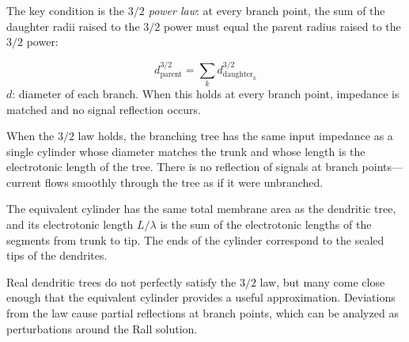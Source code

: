 The key condition is the \emph{$3/2$ power law}: at every branch point, the sum of the daughter radii raised to the $3/2$ power must equal the parent radius raised to the $3/2$ power:

\begin{keyequation}
\begin{equation}
  d_{\text{parent}}^{3/2} = \sum_k d_{\text{daughter}_k}^{3/2}
  \label{eq:rall-32}
\end{equation}
\tcblower
$d$: diameter of each branch. When this holds at every branch point, impedance is matched and no signal reflection occurs.
\end{keyequation}

\noindent When the $3/2$ law holds, the branching tree has the same input impedance as a single cylinder whose diameter matches the trunk and whose length is the electrotonic length of the tree. There is no reflection of signals at branch points---current flows smoothly through the tree as if it were unbranched.

The equivalent cylinder has the same total membrane area as the dendritic tree, and its electrotonic length $L/\lambda$ is the sum of the electrotonic lengths of the segments from trunk to tip. The ends of the cylinder correspond to the sealed tips of the dendrites.

Real dendritic trees do not perfectly satisfy the $3/2$ law, but many come close enough that the equivalent cylinder provides a useful approximation. Deviations from the law cause partial reflections at branch points, which can be analyzed as perturbations around the Rall solution.


